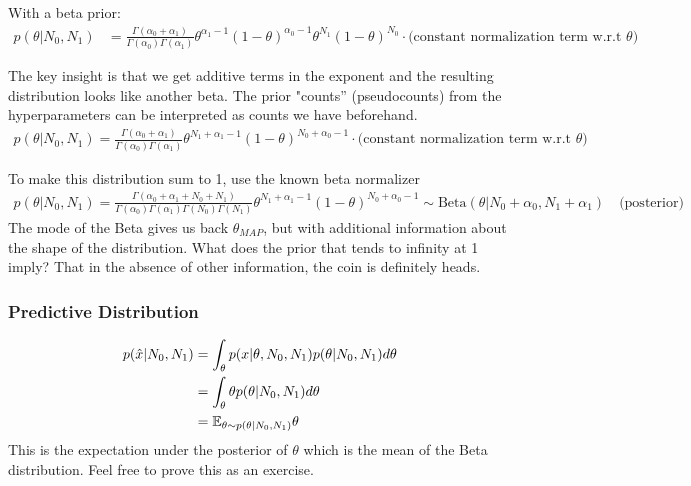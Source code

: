 \documentclass{article}
\begin{document}
\smallskip

\noindent With a beta prior: 
\begin{align*}
p(\theta|N_0,N_1) &= \frac{\Gamma(\alpha_0 + \alpha_1)}{\Gamma(\alpha_0)\Gamma(\alpha_1)} \theta^{\alpha_1-1} (1-\theta)^{\alpha_0-1} \theta^{N_1}(1-\theta)^{N_0} \cdot \textrm{(constant normalization term w.r.t $\theta$)} 
\end{align*}

\noindent The key insight is that we get additive terms in the exponent and the resulting distribution looks like another beta. The prior "counts'' (pseudocounts) from the hyperparameters can be interpreted as counts we have beforehand. \\

\begin{align*}
p(\theta|N_0,N_1) = \frac{\Gamma(\alpha_0 + \alpha_1)}{\Gamma(\alpha_0)\Gamma(\alpha_1)} \theta^{N_1 + \alpha_1-1} (1-\theta)^{N_0 + \alpha_0-1} \cdot \textrm{(constant normalization term w.r.t $\theta$)}
\end{align*}

\noindent To make this distribution sum to 1, use the known beta normalizer
\begin{align*}
p(\theta|N_0,N_1) = \frac{\Gamma(\alpha_0 + \alpha_1 + N_0 + N_1)}{\Gamma(\alpha_0)\Gamma(\alpha_1)\Gamma(N_0)\Gamma(N_1)} \theta^{N_1 + \alpha_1-1} (1-\theta)^{N_0 + \alpha_0-1} \sim \textrm{Beta}(\theta | N_0 + \alpha_0, N_1 + \alpha_1) \quad \text{(posterior)}
\end{align*}
\noindent The mode of the Beta gives us back $\theta_{MAP}$, but with additional information about the shape of the distribution. What does the prior that tends to infinity at 1 imply? That in the absence of other information, the coin is definitely heads.

\subsubsection*{Predictive Distribution}
\begin{align*}
p(\hat{x}| N_0, N_1) &= \int_\theta p(x|\theta, N_0, N_1) p(\theta | N_0, N_1) d\theta \\
&= \int_\theta \theta p(\theta | N_0, N_1) d\theta \\
&= \mathbb{E}_{\theta \sim p(\theta|N_0, N_1)} \theta
\end{align*}
\noindent This is the expectation under the posterior of $\theta$ which is the  mean of the Beta distribution. Feel free to prove this as an exercise.
\end{document}
